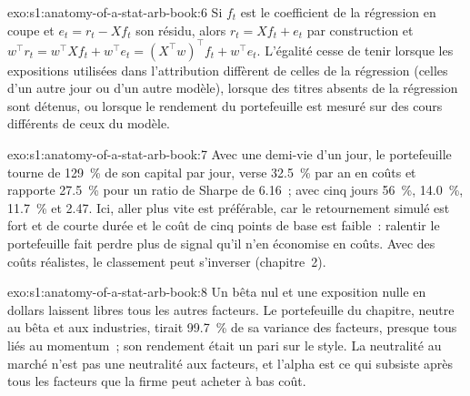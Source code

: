 \begin{solution}{exo:s1:anatomy-of-a-stat-arb-book:6}
Si $f_t$ est le coefficient de la régression en coupe et $e_t = r_t - X f_t$ son résidu, alors $r_t = X f_t + e_t$ par construction et
$w^\top r_t = w^\top X f_t + w^\top e_t = (X^\top w)^\top f_t + w^\top e_t$. L'égalité cesse de tenir lorsque les expositions utilisées dans l'attribution diffèrent de celles de la
régression (celles d'un autre jour ou d'un autre modèle), lorsque des titres absents de la régression sont détenus, ou lorsque le rendement du portefeuille est mesuré sur des
cours différents de ceux du modèle.
\end{solution}

\begin{solution}{exo:s1:anatomy-of-a-stat-arb-book:7}
Avec une demi-vie d'un jour, le portefeuille tourne de 129~\% de son capital par jour, verse 32.5~\% par an en coûts et rapporte 27.5~\% pour un ratio de Sharpe de 6.16~; avec cinq jours
56~\%, 14.0~\%, 11.7~\% et 2.47. Ici, aller plus vite est préférable, car le retournement simulé est fort et de courte durée et le coût de cinq points de base est faible~: ralentir
le portefeuille fait perdre plus de signal qu'il n'en économise en coûts. Avec des coûts réalistes, le classement peut s'inverser (chapitre~2).
\end{solution}

\begin{solution}{exo:s1:anatomy-of-a-stat-arb-book:8}
Un bêta nul et une exposition nulle en dollars laissent libres tous les autres facteurs. Le portefeuille du chapitre, neutre au bêta et aux industries, tirait 99.7~\% de sa variance des facteurs,
presque tous liés au momentum~; son rendement était un pari sur le style. La neutralité au marché n'est pas une neutralité aux facteurs, et l'alpha est ce qui subsiste après tous les facteurs que la firme peut acheter
à bas coût.
\end{solution}

